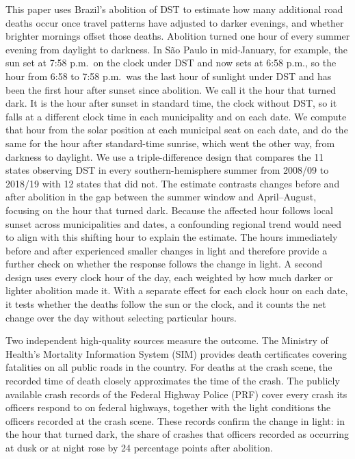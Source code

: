 This paper uses Brazil's abolition of DST to estimate how many additional road deaths occur once travel patterns have adjusted to darker evenings, and whether brighter mornings offset those deaths. Abolition turned one hour of every summer evening from daylight to darkness. In S\~ao Paulo in mid-January, for example, the sun set at 7:58 p.m.\ on the clock under DST and now sets at 6:58 p.m., so the hour from 6:58 to 7:58 p.m.\ was the last hour of sunlight under DST and has been the first hour after sunset since abolition. We call it the hour that turned dark. It is the hour after sunset in standard time, the clock without DST, so it falls at a different clock time in each municipality and on each date. We compute that hour from the solar position at each municipal seat on each date, and do the same for the hour after standard-time sunrise, which went the other way, from darkness to daylight. We use a triple-difference design that compares the 11 states observing DST in every southern-hemisphere summer from 2008/09 to 2018/19 with 12 states that did not. The estimate contrasts changes before and after abolition in the gap between the summer window and April--August, focusing on the hour that turned dark. Because the affected hour follows local sunset across municipalities and dates, a confounding regional trend would need to align with this shifting hour to explain the estimate. The hours immediately before and after experienced smaller changes in light and therefore provide a further check on whether the response follows the change in light. A second design uses every clock hour of the day, each weighted by how much darker or lighter abolition made it. With a separate effect for each clock hour on each date, it tests whether the deaths follow the sun or the clock, and it counts the net change over the day without selecting particular hours.

Two independent high-quality sources measure the outcome. The Ministry of Health's Mortality Information System (SIM) provides death certificates covering fatalities on all public roads in the country. For deaths at the crash scene, the recorded time of death closely approximates the time of the crash. The publicly available crash records of the Federal Highway Police (PRF) cover every crash its officers respond to on federal highways, together with the light conditions the officers recorded at the crash scene. These records confirm the change in light: in the hour that turned dark, the share of crashes that officers recorded as occurring at dusk or at night rose by 24 percentage points after abolition.

